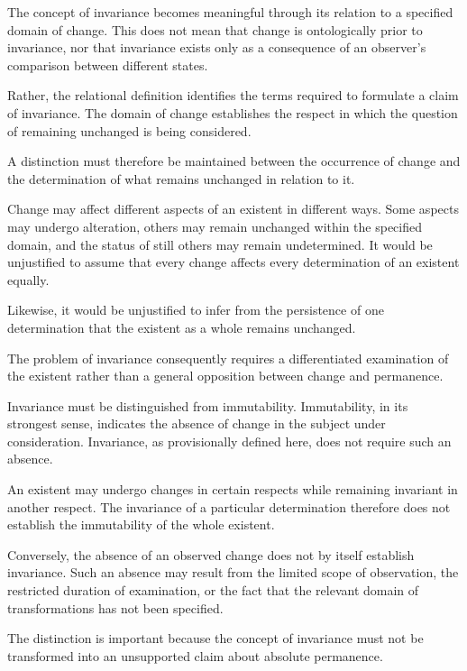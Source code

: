 The concept of invariance becomes meaningful through its
relation to a specified domain of change. This does not
mean that change is ontologically prior to invariance,
nor that invariance exists only as a consequence of an
observer's comparison between different states.

Rather, the relational definition identifies the terms
required to formulate a claim of invariance. The domain
of change establishes the respect in which the question
of remaining unchanged is being considered.

A distinction must therefore be maintained between
the occurrence of change and the determination of what
remains unchanged in relation to it.

Change may affect different aspects of an existent in
different ways. Some aspects may undergo alteration,
others may remain unchanged within the specified domain,
and the status of still others may remain undetermined.
It would be unjustified to assume that every change
affects every determination of an existent equally.

Likewise, it would be unjustified to infer from the
persistence of one determination that the existent as
a whole remains unchanged.

The problem of invariance consequently requires a
differentiated examination of the existent rather than
a general opposition between change and permanence.


Invariance must be distinguished from immutability.
Immutability, in its strongest sense, indicates the
absence of change in the subject under consideration.
Invariance, as provisionally defined here, does not
require such an absence.

An existent may undergo changes in certain respects
while remaining invariant in another respect. The
invariance of a particular determination therefore
does not establish the immutability of the whole existent.

Conversely, the absence of an observed change does not
by itself establish invariance. Such an absence may
result from the limited scope of observation, the
restricted duration of examination, or the fact that
the relevant domain of transformations has not been
specified.

The distinction is important because the concept of
invariance must not be transformed into an unsupported
claim about absolute permanence.

